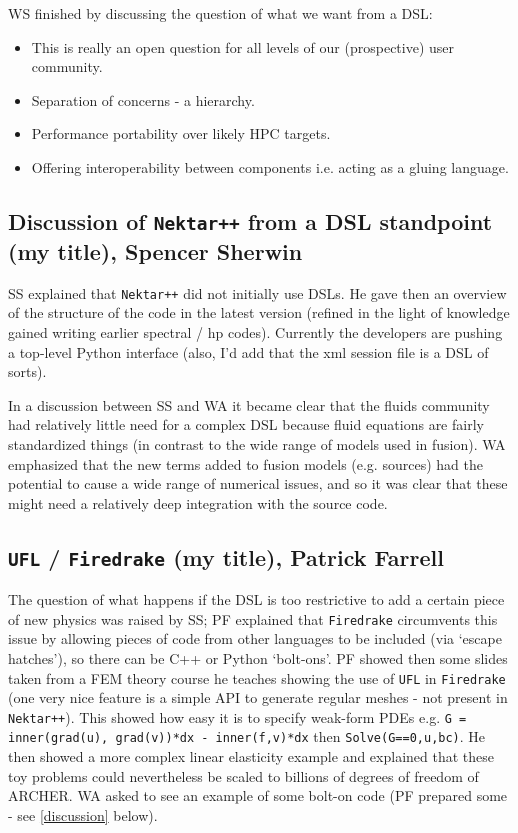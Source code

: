 \documentclass[11pt]{article}
\begin{document}
WS finished by discussing the question of what we want from a DSL:

\begin{itemize}
\item This is really an open question for all levels of our (prospective) user 
community.
\item Separation of concerns - a hierarchy.
\item Performance portability over likely HPC targets.
\item Offering interoperability between components i.e. acting as a gluing 
language. 
\end{itemize}

\subsection{Discussion of {\tt Nektar++} from a DSL standpoint (my title), 
Spencer Sherwin}

SS explained that {\tt Nektar++} did not initially use DSLs.  He gave then an 
overview of the structure of the code in the latest version (refined in the 
light of knowledge gained writing earlier spectral / hp codes).  Currently the 
developers are pushing a top-level Python interface (also, I'd add that the xml 
session file is a DSL of sorts).

In a discussion between SS and WA it became clear that the fluids community had 
relatively little need for a complex DSL because fluid equations are fairly 
standardized things (in contrast to the wide range of models used in fusion).  
WA emphasized that the new terms added to fusion models (e.g. sources) had the 
potential to cause a wide range of numerical issues, and so it was clear that 
these might need a relatively deep integration with the source code.

\subsection{{\tt UFL} / {\tt Firedrake} (my title), Patrick Farrell}

The question of what happens if the DSL is too restrictive to add a certain 
piece of new physics was raised by SS; PF explained that {\tt Firedrake} 
circumvents this issue by allowing pieces of code from other languages to be 
included (via `escape hatches'), so there can be C++ or Python `bolt-ons'.  PF 
showed then some slides taken from a FEM theory course he teaches showing the 
use of {\tt UFL} in {\tt Firedrake} (one very nice feature is a simple API to 
generate regular meshes - not present in {\tt Nektar++}).  This showed how easy 
it is to specify weak-form PDEs e.g. {\tt G = inner(grad(u), grad(v))*dx - 
inner(f,v)*dx} then {\tt Solve(G==0,u,bc)}.  He then showed a more complex 
linear elasticity example and explained that these toy problems could 
nevertheless be scaled to billions of degrees of freedom of ARCHER.  WA asked 
to see an example of some bolt-on code (PF prepared some - see \ref{discussion} 
below).
\end{document}

